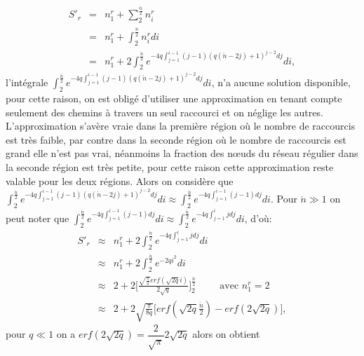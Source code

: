 \begin{eqnarray}
S'_r &=&n_{1}^{r}+\sum^{\frac{\acute{n}}{2}}_2n_{i}^{r}\\\nonumber
&=&n_{1}^{r}+\int^{\frac{\acute{n}}{2}}_2n_{i}^{r}di\\\nonumber
&=&n_{1}^{r}+2\int^{\frac{\acute{n}}{2}}_2e^{-4q\int_{j=1}^{i-1}(j-1)(q(\acute{n}-2j)+1)^{j-2}dj}di,\nonumber
\end{eqnarray}
l'intégrale $\int^{\frac{\acute{n}}{2}}_2e^{-4q\int_{j=1}^{i-1}(j-1)(q(\acute{n}-2j)+1)^{j-2}dj}di$, n'a aucune solution disponible, pour cette raison, on est obligé d'utiliser une approximation en tenant compte seulement des chemins à travers un seul raccourci et on néglige les autres.\\
L'approximation s'avère vraie dans la première région où le nombre de raccourcis est très faible, par contre dans
la seconde région où le nombre de raccourcis est grand elle n'est pas vrai, néanmoins la fraction des nœuds du réseau régulier dans la seconde région est très petite, pour cette raison cette approximation reste valable pour les deux régions. Alors on considère que 
$\int^{\frac{\acute{n}}{2}}_2e^{-4q\int_{j=1}^{i-1}(j-1)(q(\acute{n}-2j)+1)^{j-2}dj}di\approx\int^{\frac{\acute{n}}{2}}_2e^{-4q\int_{j=1}^{i-1}(j-1)dj}di$.
Pour $\acute{n}\gg 1$ on peut noter que $ \int^{\frac{\acute{n}}{2}}_2e^{-4q\int_{j=1}^{i-1}(j-1)dj}di\approx\int^{\frac{\acute{n}}{2}}_2e^{-4q\int_{j=1}^{i}jdj}di$,
d'où:
\begin{eqnarray}
\label{sr}
S'_r &\approx&n_{1}^{r}+2\int^{\frac{\acute{n}}{2}}_2e^{-4q\int_{j=1}^{i}jdj}di\\\nonumber
&\approx&n_{1}^{r}+2\int^{\frac{\acute{n}}{2}}_2e^{-2qi^2}di\\\nonumber
&\approx&2+2\Big[\frac{\sqrt{\frac{\pi}{2}}erf(\sqrt{2q}i)}{2\sqrt{q}}\Big]^{\frac{\acute{n}}{2}}_2 \hspace{1cm}
\textrm{avec }  n_{1}^{r}=2 \\\nonumber
&\approx&2+ 2\sqrt{\frac{\pi}{8q}}\Big[erf(\sqrt{2q}\frac{\acute{n}}{2})-erf(2\sqrt{2q})\Big], \nonumber
\end{eqnarray}
pour $q\ll 1$ on a $erf(2\sqrt{2q})=\dfrac{2}{\sqrt{\pi}}2\sqrt{2q}$ alors on obtient

